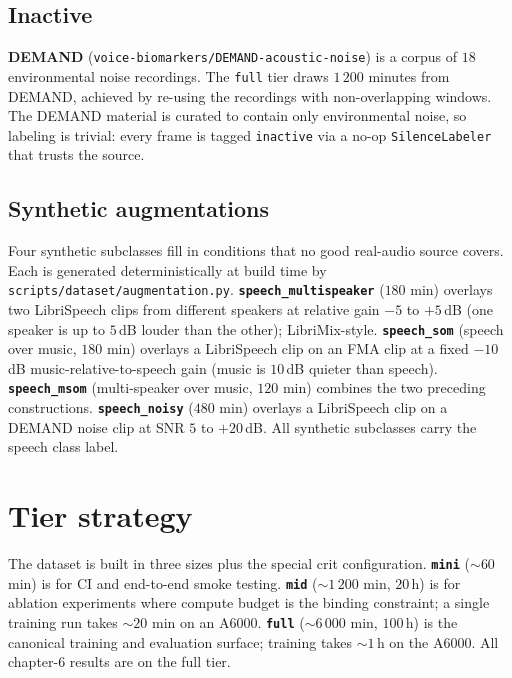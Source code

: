 \subsection*{Inactive}

\textbf{DEMAND} (\texttt{voice-biomarkers/DEMAND-acoustic-noise}) is a corpus of $18$ environmental noise recordings.
The \texttt{full} tier draws $1\,200$ minutes from DEMAND, achieved by re-using the recordings with non-overlapping windows.
The DEMAND material is curated to contain only environmental noise, so labeling is trivial: every frame is tagged \texttt{inactive} via a no-op \texttt{SilenceLabeler} that trusts the source.

\subsection*{Synthetic augmentations}
\label{sec:dataset_augmentations}

Four synthetic subclasses fill in conditions that no good real-audio source covers.
Each is generated deterministically at build time by \texttt{scripts/dataset/augmentation.py}.
\textbf{\texttt{speech\_multispeaker}} ($180$ min) overlays two LibriSpeech clips from different speakers at relative gain $-5$ to $+5$\,dB (one speaker is up to $5$\,dB louder than the other); LibriMix-style.
\textbf{\texttt{speech\_som}} (speech over music, $180$ min) overlays a LibriSpeech clip on an FMA clip at a fixed $-10$\,dB music-relative-to-speech gain (music is $10$\,dB quieter than speech).
\textbf{\texttt{speech\_msom}} (multi-speaker over music, $120$ min) combines the two preceding constructions.
\textbf{\texttt{speech\_noisy}} ($480$ min) overlays a LibriSpeech clip on a DEMAND noise clip at SNR $5$ to $+20$\,dB.
All synthetic subclasses carry the speech class label.

\section{Tier strategy}
\label{sec:dataset_tier_strategy}

The dataset is built in three sizes plus the special crit configuration.
\textbf{\texttt{mini}} ($\sim 60$ min) is for CI and end-to-end smoke testing.
\textbf{\texttt{mid}} ($\sim 1\,200$ min, $20$\,h) is for ablation experiments where compute budget is the binding constraint; a single training run takes $\sim 20$ min on an A6000.
\textbf{\texttt{full}} ($\sim 6\,000$ min, $100$\,h) is the canonical training and evaluation surface; training takes $\sim 1$\,h on the A6000.
All chapter-6 results are on the full tier.

